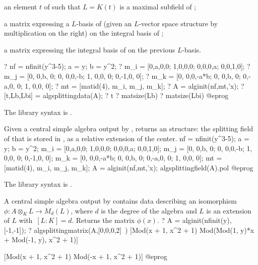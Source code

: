  \item an element $t$ of  such that $L=K(t)$ is a maximal subfield
of ;

 \item a matrix  expressing a $L$-basis of  (given an
$L$-vector space structure by multiplication on the right) on the integral
basis of ;

 \item a matrix  expressing the integral basis of  on
the previous $L$-basis.

\bprog
? nf = nfinit(y^3-5); a = y; b = y^2;
? {m_i = [0,a,0,0;
          1,0,0,0;
          0,0,0,a;
          0,0,1,0];}
? {m_j = [0, 0,b, 0;
          0, 0,0,-b;
          1, 0,0, 0;
          0,-1,0, 0];}
? {m_k = [0, 0,0,-a*b;
          0, 0,b,   0;
          0,-a,0,   0;
          1, 0,0,   0];}
? mt = [matid(4), m_i, m_j, m_k];
? A = alginit(nf,mt,'x);
? [t,Lb,Lbi] = algsplittingdata(A);
? t
? matsize(Lb)
? matsize(Lbi)
@eprog

The library syntax is .

\label{se:algsplittingfield}
Given a central simple algebra  output by , returns
an  structure: the splitting field of  that is stored in
, as a relative extension of the center.
\bprog
nf = nfinit(y^3-5);
a = y; b = y^2;
{m_i = [0,a,0,0;
       1,0,0,0;
       0,0,0,a;
       0,0,1,0];}
{m_j = [0, 0,b, 0;
       0, 0,0,-b;
       1, 0,0, 0;
       0,-1,0, 0];}
{m_k = [0, 0,0,-a*b;
       0, 0,b,   0;
       0,-a,0,   0;
       1, 0,0,   0];}
mt = [matid(4), m_i, m_j, m_k];
A = alginit(nf,mt,'x);
algsplittingfield(A).pol
@eprog

The library syntax is .

\label{se:algsplittingmatrix}
A central simple algebra  output by  contains data
describing an isomorphism~$\phi : A\otimes_K L \to M_d(L)$, where $d$ is the
degree of the algebra and $L$ is an extension of $L$ with~$[L:K]=d$. Returns
the matrix $\phi(x)$.
\bprog
? A = alginit(nfinit(y), [-1,-1]);
? algsplittingmatrix(A,[0,0,0,2]~)
[Mod(x + 1, x^2 + 1) Mod(Mod(1, y)*x + Mod(-1, y), x^2 + 1)]

[Mod(x + 1, x^2 + 1)                   Mod(-x + 1, x^2 + 1)]
@eprog

